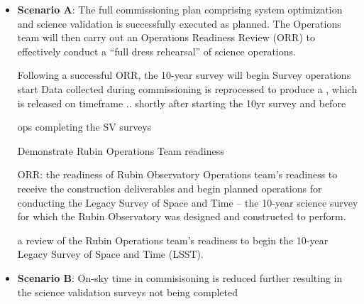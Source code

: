 \begin{itemize}
\item \textbf{Scenario A}:
The full commissioning plan comprising system optimization and science validation is successfully executed as planned. 
The Operations team will then carry out an Operations Readiness Review (ORR) to effectively conduct a “full dress rehearsal” of science operations. 

Following a successful ORR, the 10-year survey will begin
 Survey operations start 
 Data collected during commissioning is reprocessed to produce a \dpone, which is released on timeframe .. shortly after starting the 10yr survey and before \drone

ops completing the SV surveys 

Demonstrate Rubin Operations Team readiness

ORR:  the readiness of Rubin Observatory Operations team’s readiness to
receive the construction deliverables and begin planned operations for conducting the Legacy
Survey of Space and Time – the 10-year science survey for which the Rubin Observatory was
designed and constructed to perform. 

	
 a review of the Rubin Operations team’s readiness to begin the 10-year Legacy
Survey of Space and Time (LSST).


\item \textbf{Scenario B}:
On-sky time in commisisoning is reduced further resulting in the science validation surveys not being completed 


\end{itemize}



